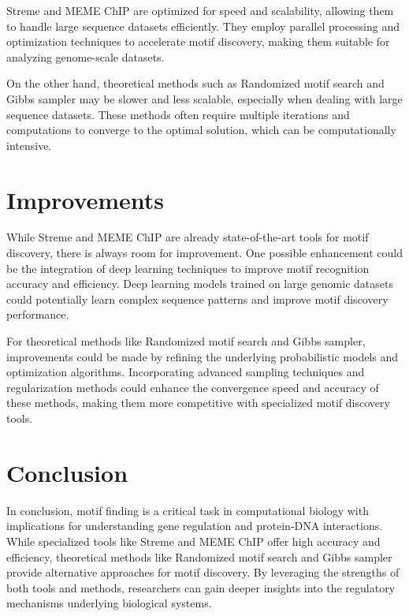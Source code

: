 \documentclass{article}
\begin{document}
Streme and MEME ChIP are optimized for speed and scalability, allowing them to handle large sequence datasets efficiently. They employ parallel processing and optimization techniques to accelerate motif discovery, making them suitable for analyzing genome-scale datasets.

On the other hand, theoretical methods such as Randomized motif search and Gibbs sampler may be slower and less scalable, especially when dealing with large sequence datasets. These methods often require multiple iterations and computations to converge to the optimal solution, which can be computationally intensive.

\section{Improvements}

While Streme and MEME ChIP are already state-of-the-art tools for motif discovery, there is always room for improvement. One possible enhancement could be the integration of deep learning techniques to improve motif recognition accuracy and efficiency. Deep learning models trained on large genomic datasets could potentially learn complex sequence patterns and improve motif discovery performance.

For theoretical methods like Randomized motif search and Gibbs sampler, improvements could be made by refining the underlying probabilistic models and optimization algorithms. Incorporating advanced sampling techniques and regularization methods could enhance the convergence speed and accuracy of these methods, making them more competitive with specialized motif discovery tools.

\section{Conclusion}

In conclusion, motif finding is a critical task in computational biology with implications for understanding gene regulation and protein-DNA interactions. While specialized tools like Streme and MEME ChIP offer high accuracy and efficiency, theoretical methods like Randomized motif search and Gibbs sampler provide alternative approaches for motif discovery. By leveraging the strengths of both tools and methods, researchers can gain deeper insights into the regulatory mechanisms underlying biological systems.
\end{document}
